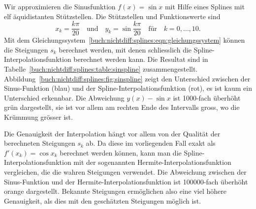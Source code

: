 \begin{beispiel}
\label{buch:nichtdiff:splines:bsp:sinspline}


Wir approximieren die Sinusfunktion $f(x)=\sin x$ mit Hilfe eines Splines
mit elf äquidistanten Stützstellen.
Die Stützstellen und Funktionswerte sind
\[
x_k = \frac{k\pi}{20}
\quad\text{und}\quad
y_k = \sin\frac{k\pi}{20}
\quad\text{für}\quad
k=0,\dots,10.
\]
Mit dem Gleichungssystem~\eqref{buch:nichtdiff:splines:eqn:gleichungssystem}
können die Steigungen $s_k$ berechnet werden, mit denen schliesslich die
Spline-Interpolationsfunktion berechnet werden kann.
Die Resultat sind in Tabelle~\ref{buch:nichtdiff:splines:table:sinspline}
zusammengestellt.
Abbildung~\ref{buch:nichtdiff:splines:fig:sinspline} zeigt den Unterschied
zwischen der Sinus-Funktion (blau) und der Spline-Interpolationsfunktion (rot),
es ist kaum ein Unterschied erkennbar.
Die Abweichung $y(x)-\sin x$ ist 1000-fach überhöht grün dargestellt, sie
ist vor allem am rechten Ende des Intervalls gross, wo die Krümmung grösser
ist.

Die Genauigkeit der Interpolation hängt vor allem von der Qualität der 
berechneten Steigungen $s_k$ ab.
Da diese im vorliegenden Fall exakt als $f'(x_k) = \cos x_k$ berechnet
werden können, kann man die Spline-Interpolationsfunktion mit der sogenannten
Hermite-Interpolationsfunktion vergleichen, die die wahren Steigungen
verwendet.
Die Abweichung zwischen der Sinus-Funktion und der
Hermite-Interpolationsfunktion ist 100000-fach überhöht orange dargestellt.
Bekannte Steigungen ermöglichen also eine viel höhere Genauigkeit, als dies
mit den geschätzten Steigungen möglich ist.
\end{beispiel}

%
%

